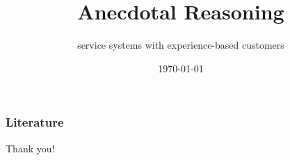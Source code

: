 \documentclass[aspectratio = 169,compress,xcolor=dvipsnames]{beamer}
\title					{Anecdotal Reasoning}
\subtitle				{service systems with experience-based customers}
\author					{\iiname}
\institute				{Macau  University of Science and Technology}
\date					{\today}
\begin{document}
\maketitle







\begin{frame}
\frametitle{Literature}
\nocite{*}
{\fz{8pt} 
	}
\end{frame}





\begin{thanksframe}{Thank you!}

\end{thanksframe}
\end{document}
